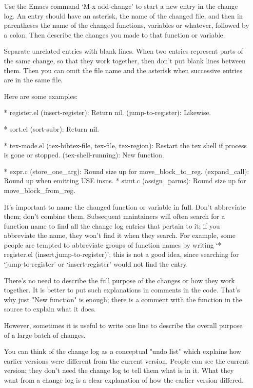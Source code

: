    Use the Emacs command `M-x add-change' to start a new entry in the
change log.  An entry should have an asterisk, the name of the changed
file, and then in parentheses the name of the changed functions,
variables or whatever, followed by a colon.  Then describe the changes
you made to that function or variable.

   Separate unrelated entries with blank lines.  When two entries
represent parts of the same change, so that they work together, then
don't put blank lines between them.  Then you can omit the file name
and the asterisk when successive entries are in the same file.

   Here are some examples:

     * register.el (insert-register): Return nil.
     (jump-to-register): Likewise.
     
     * sort.el (sort-subr): Return nil.
     
     * tex-mode.el (tex-bibtex-file, tex-file, tex-region):
     Restart the tex shell if process is gone or stopped.
     (tex-shell-running): New function.
     
     * expr.c (store_one_arg): Round size up for move_block_to_reg.
     (expand_call): Round up when emitting USE insns.
     * stmt.c (assign_parms): Round size up for move_block_from_reg.

   It's important to name the changed function or variable in full.
Don't abbreviate them; don't combine them.  Subsequent maintainers will
often search for a function name to find all the change log entries that
pertain to it; if you abbreviate the name, they won't find it when they
search.  For example, some people are tempted to abbreviate groups of
function names by writing `* register.el ({insert,jump-to}-register)';
this is not a good idea, since searching for `jump-to-register' or
`insert-register' would not find the entry.

   There's no need to describe the full purpose of the changes or how
they work together.  It is better to put such explanations in comments
in the code.  That's why just "New function" is enough; there is a
comment with the function in the source to explain what it does.

   However, sometimes it is useful to write one line to describe the
overall purpose of a large batch of changes.

   You can think of the change log as a conceptual "undo list" which
explains how earlier versions were different from the current version.
People can see the current version; they don't need the change log to
tell them what is in it.  What they want from a change log is a clear
explanation of how the earlier version differed.

